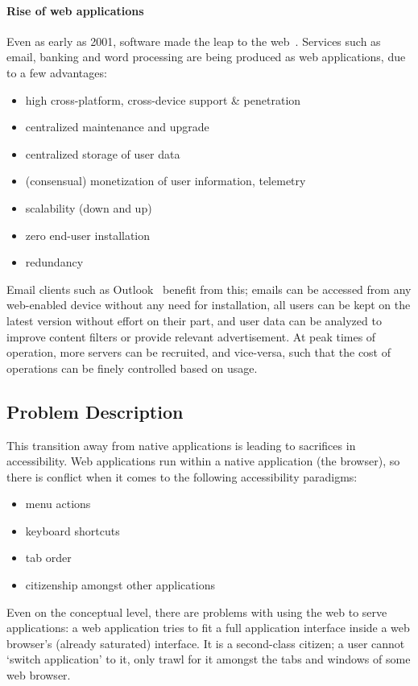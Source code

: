 \documentclass[11pt,openright,a4paper]{report}
\begin{document}
\paragraph{Rise of web applications}
Even as early as 2001, software made the leap to the web~\cite{ginige2001web}. Services such as email, banking and word processing are being produced as web applications, due to a few advantages:
\begin{itemize}
  \item high cross-platform, cross-device support \& penetration
  \item centralized maintenance and upgrade
  \item centralized storage of user data
  \item (consensual) monetization of user information, telemetry
  \item scalability (down and up)
  \item zero end-user installation
  \item redundancy
\end{itemize}
Email clients such as Outlook~\cite{outlookcom} benefit from this; emails can be accessed from any web-enabled device without any need for installation, all users can be kept on the latest version without effort on their part, and user data can be analyzed to improve content filters or provide relevant advertisement. At peak times of operation, more servers can be recruited, and vice-versa, such that the cost of operations can be finely controlled based on usage.
\subsection{Problem Description}
This transition away from native applications is leading to sacrifices in accessibility. Web applications run within a native application (the browser), so there is conflict when it comes to the following accessibility paradigms:
\begin{itemize}
 \item menu actions
 \item keyboard shortcuts
 \item tab order
 \item citizenship amongst other applications
\end{itemize}

Even on the conceptual level, there are problems with using the web to serve applications: a web application tries to fit a full application interface inside a web browser's (already saturated) interface. It is a second-class citizen; a user cannot `switch application' to it, only trawl for it amongst the tabs and windows of some web browser.
\end{document}
